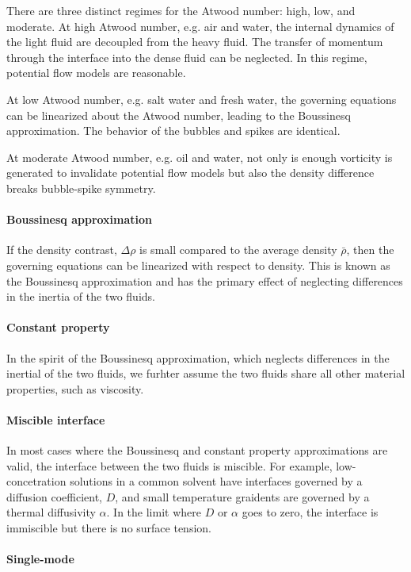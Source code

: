 There are three distinct regimes for the Atwood number: high, low, and moderate.
At high Atwood number, e.g. air and water, the internal dynamics of the light fluid are decoupled from the heavy fluid.
The transfer of momentum through the interface into the dense fluid can be neglected.
In this regime, potential flow models are reasonable.

At low Atwood number, e.g. salt water and fresh water, the governing equations can be linearized about the Atwood number, leading to the Boussinesq approximation.
The behavior of the bubbles and spikes are identical.

At moderate Atwood number, e.g. oil and water, not only is enough vorticity is generated to invalidate potential flow models but also the density difference breaks bubble-spike symmetry.

\paragraph{Boussinesq approximation}
If the density contrast, $\Delta \rho$ is small compared to the average density $\bar{\rho}$, then 
the governing equations can be linearized with respect to density.
This is known as the Boussinesq approximation and has the primary effect of neglecting differences in the inertia of the two fluids.

\paragraph{Constant property}
In the spirit of the Boussinesq approximation, which neglects differences in the inertial of the two fluids, we furhter assume the two fluids share all other material properties, such as viscosity.

\paragraph{Miscible interface}
In most cases where the Boussinesq and constant property approximations are valid, the interface between the two fluids is miscible.
For example, low-concetration solutions in a common solvent have interfaces governed by a diffusion coefficient, $D$, and small temperature graidents are governed by a thermal diffusivity $\alpha$.
In the limit where $D$ or $\alpha$ goes to zero, the interface is immiscible but there is no surface tension.

\paragraph{Single-mode}

